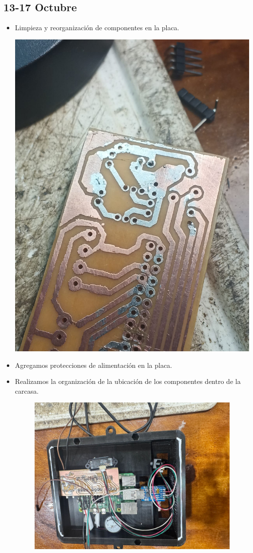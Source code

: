 \documentclass[12pt,a4paper]{article}
\begin{document}
\subsection*{13-17 Octubre}
\begin{itemize}
\item Limpieza y reorganización de componentes en la placa.

    \includegraphics[width=0.5\linewidth]{Carpeta de campo/placa limpia.png}

\item Agregamos protecciones de alimentación en la placa.

\item Realizamos la organización de la ubicación de los componentes dentro de la carcasa.

\begin{figure}[H]
    \centering
    \includegraphics[width=0.75\linewidth]{Carpeta de campo/tapa org.png}
\end{figure}


\end{itemize}
\end{document}
